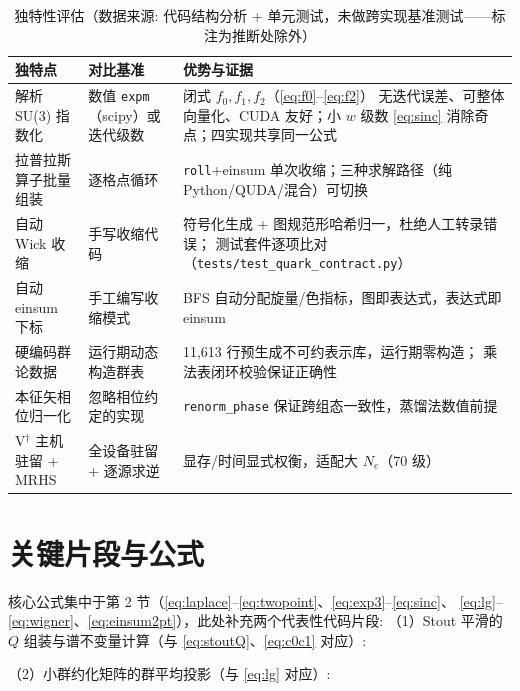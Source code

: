 \documentclass[UTF8]{ctexart}
\begin{document}
\begin{table}[htbp]\centering
\begin{tabularx}{\textwidth}{lXX}
\toprule
\textcolor{algo}{独特点} & 对比基准 & 优势与证据 \\
\midrule
解析 SU(3) 指数化 & 数值 \texttt{expm}（scipy）或迭代级数 & 闭式 $f_0,f_1,f_2$（\eqref{eq:f0}--\eqref{eq:f2}）
  无迭代误差、可整体向量化、CUDA 友好；小 $w$ 级数 \eqref{eq:sinc} 消除奇点；四实现共享同一公式 \\
拉普拉斯算子批量组装 & 逐格点循环 & \texttt{roll}+einsum 单次收缩；三种求解路径（纯 Python/QUDA/混合）可切换 \\
自动 Wick 收缩 & 手写收缩代码 & 符号化生成 + 图规范形哈希归一，杜绝人工转录错误；
  测试套件逐项比对（\texttt{tests/test\_quark\_contract.py}） \\
自动 einsum 下标 & 手工编写收缩模式 & BFS 自动分配旋量/色指标，图即表达式，表达式即 einsum \\
硬编码群论数据 & 运行期动态构造群表 & 11{,}613 行预生成不可约表示库，运行期零构造；
  乘法表闭环校验保证正确性 \\
本征矢相位归一化 & 忽略相位约定的实现 & \texttt{renorm\_phase} 保证跨组态一致性，蒸馏法数值前提 \\
V$^\dagger$ 主机驻留 + MRHS & 全设备驻留 + 逐源求逆 & 显存/时间显式权衡，适配大 $N_e$（70 级）\\
\bottomrule
\end{tabularx}
\caption{独特性评估（数据来源: 代码结构分析 + 单元测试，未做跨实现基准测试——标注为推断处除外）}
\end{table}

\section{关键片段与公式}

核心公式集中于第 2 节（\eqref{eq:laplace}--\eqref{eq:twopoint}、\eqref{eq:exp3}--\eqref{eq:sinc}、
\eqref{eq:lg}--\eqref{eq:wigner}、\eqref{eq:einsum2pt}），此处补充两个代表性代码片段:
（1）Stout 平滑的 $Q$ 组装与谱不变量计算（与 \eqref{eq:stoutQ}、\eqref{eq:c0c1} 对应）:


（2）小群约化矩阵的群平均投影（与 \eqref{eq:lg} 对应）:


\end{document}
